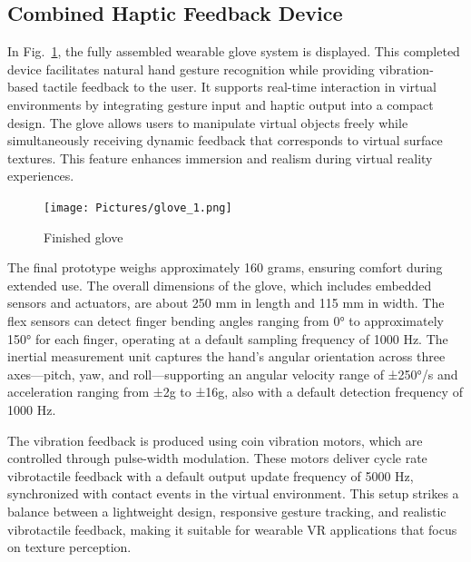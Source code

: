 \subsection{Combined Haptic Feedback Device}
In Fig.~\ref{fig:finalglove}, the fully assembled wearable glove system is displayed. This completed device facilitates natural hand gesture recognition while providing vibration-based tactile feedback to the user. It supports real-time interaction in virtual environments by integrating gesture input and haptic output into a compact design. The glove allows users to manipulate virtual objects freely while simultaneously receiving dynamic feedback that corresponds to virtual surface textures. This feature enhances immersion and realism during virtual reality experiences.

\begin{figure}[H]\centering
	\texttt{[image: Pictures/glove\_1.png]}%
	\caption{Finished glove}\label{fig:finalglove}%
\end{figure}

The final prototype weighs approximately 160 grams, ensuring comfort during extended use. The overall dimensions of the glove, which includes embedded sensors and actuators, are about 250 mm in length and 115 mm in width. The flex sensors can detect finger bending angles ranging from 0° to approximately 150° for each finger, operating at a default sampling frequency of 1000 Hz. The inertial measurement unit captures the hand's angular orientation across three axes—pitch, yaw, and roll—supporting an angular velocity range of ±250°/s and acceleration ranging from ±2g to ±16g, also with a default detection frequency of 1000 Hz.

The vibration feedback is produced using coin vibration motors, which are controlled through pulse-width modulation. These motors deliver cycle rate vibrotactile feedback with a default output update frequency of 5000 Hz, synchronized with contact events in the virtual environment. This setup strikes a balance between a lightweight design, responsive gesture tracking, and realistic vibrotactile feedback, making it suitable for wearable VR applications that focus on texture perception.
